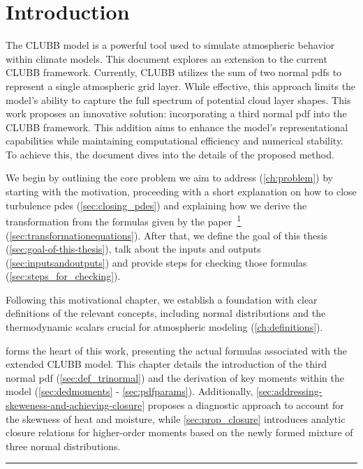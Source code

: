 \chapter{Introduction}\label{ch:introduction}

The \gls{CLUBB} model is a powerful tool used to simulate atmospheric behavior within climate models.
This document explores an extension to the current \gls{CLUBB} framework.
Currently, \gls{CLUBB} utilizes the sum of two normal \glspl{pdf}
to represent a single atmospheric grid layer.
While effective,
this approach limits the model's ability to capture the full spectrum of potential cloud layer shapes.
This work proposes an innovative solution:
incorporating a third normal \gls{pdf} into the \gls{CLUBB} framework.
This addition aims to enhance the model's representational capabilities
while maintaining computational efficiency and numerical stability.
To achieve this, the document dives into the details of the proposed method.

We begin by outlining the core problem we aim to address (\cref{ch:problem})
by starting with the motivation,
proceeding with a short explanation on how to close turbulence \glspl{pde} (\cref{sec:closing_pdes})
and explaining how we derive the transformation from the formulas
given by the paper~\footcite{larson2005using} (\cref{sec:transformationequations}).
After that, we define the goal of this thesis (\cref{sec:goal-of-this-thesis}),
talk about the inputs and outputs (\cref{sec:inputsandoutputs})
and provide steps for checking those formulas (\cref{sec:steps_for_checking}).

Following this motivational chapter,
we establish a foundation with clear definitions of the relevant concepts,
including normal distributions and the thermodynamic scalars
crucial for atmospheric modeling (\cref{ch:definitions}).

 forms the heart of this work,
presenting the actual formulas associated with the extended \gls{CLUBB} model.
This chapter details the introduction of the third normal \gls{pdf} (\cref{sec:def_trinormal})
and the derivation of key moments within the model (\cref{sec:dedmoments} - \cref{sec:pdfparams}).
Additionally,
\cref{sec:addressing-skeweness-and-achieving-closure} proposes a diagnostic approach
to account for the skewness of heat and moisture,
while \cref{sec:prop_closure} introduces analytic closure relations
for higher-order moments based on the newly formed mixture of three normal distributions.

